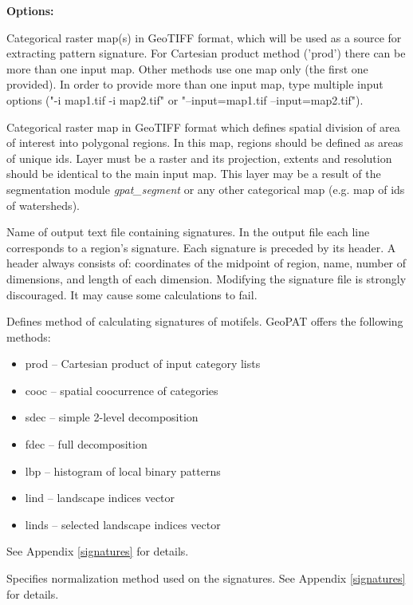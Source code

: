 {\bf Options:}


Categorical raster map(s) in GeoTIFF format, which will be used as a source for extracting pattern signature. For Cartesian product method ('prod') there can be more than one input map. Other methods use one map only (the first one provided). In order to provide more than one input map, type multiple input options ("-i map1.tif -i map2.tif" or "--input=map1.tif --input=map2.tif").


Categorical raster map in GeoTIFF format which defines spatial division of area of interest into polygonal regions. In this map, regions should be defined as areas of unique ids. Layer must be a raster and its projection, extents and resolution should be identical to the main input map. This layer may be a result of the segmentation module {\it gpat\_segment} or any other categorical map (e.g. map of ids of watersheds).


Name of output text file containing signatures. In the output file each line corresponds to a region's signature. Each signature is preceded by its header. A header always consists of: coordinates of the midpoint of region, name, number of dimensions, and length of each dimension. Modifying the signature file is strongly discouraged. It may cause some calculations to fail.


Defines method of calculating signatures of motifels. GeoPAT offers the following methods: 
\begin{itemize}
	\item prod -- Cartesian product of input category lists
	\item cooc -- spatial coocurrence of categories
	\item sdec -- simple 2-level decomposition
	\item fdec -- full decomposition
	\item lbp -- histogram of local binary patterns
	\item lind -- landscape indices vector
	\item linds -- selected landscape indices vector
\end{itemize}
See Appendix \ref{signatures} for details.


Specifies normalization method used on the signatures. See Appendix \ref{signatures} for details.

